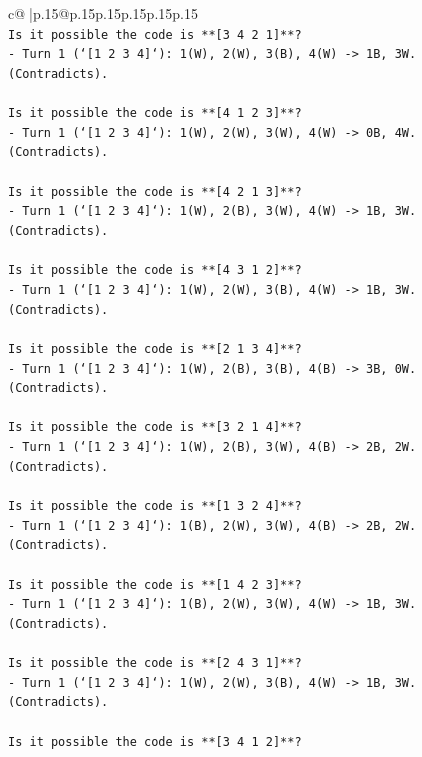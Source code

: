\documentclass{article}
\begin{document}
{\begin{supertabular}{c@{$\;$}|p{.15\linewidth}@{}p{.15\linewidth}p{.15\linewidth}p{.15\linewidth}p{.15\linewidth}p{.15\linewidth}}
{{{\\ 
\texttt{Is it possible the code is **{[}3 4 2 1{]}**?} \\
\texttt{{-} Turn 1 (`{[}1 2 3 4{]}`): 1(W), 2(W), 3(B), 4(W) {-}> 1B, 3W. (Contradicts).} \\
\\ 
\texttt{Is it possible the code is **{[}4 1 2 3{]}**?} \\
\texttt{{-} Turn 1 (`{[}1 2 3 4{]}`): 1(W), 2(W), 3(W), 4(W) {-}> 0B, 4W. (Contradicts).} \\
\\ 
\texttt{Is it possible the code is **{[}4 2 1 3{]}**?} \\
\texttt{{-} Turn 1 (`{[}1 2 3 4{]}`): 1(W), 2(B), 3(W), 4(W) {-}> 1B, 3W. (Contradicts).} \\
\\ 
\texttt{Is it possible the code is **{[}4 3 1 2{]}**?} \\
\texttt{{-} Turn 1 (`{[}1 2 3 4{]}`): 1(W), 2(W), 3(B), 4(W) {-}> 1B, 3W. (Contradicts).} \\
\\ 
\texttt{Is it possible the code is **{[}2 1 3 4{]}**?} \\
\texttt{{-} Turn 1 (`{[}1 2 3 4{]}`): 1(W), 2(B), 3(B), 4(B) {-}> 3B, 0W. (Contradicts).} \\
\\ 
\texttt{Is it possible the code is **{[}3 2 1 4{]}**?} \\
\texttt{{-} Turn 1 (`{[}1 2 3 4{]}`): 1(W), 2(B), 3(W), 4(B) {-}> 2B, 2W. (Contradicts).} \\
\\ 
\texttt{Is it possible the code is **{[}1 3 2 4{]}**?} \\
\texttt{{-} Turn 1 (`{[}1 2 3 4{]}`): 1(B), 2(W), 3(W), 4(B) {-}> 2B, 2W. (Contradicts).} \\
\\ 
\texttt{Is it possible the code is **{[}1 4 2 3{]}**?} \\
\texttt{{-} Turn 1 (`{[}1 2 3 4{]}`): 1(B), 2(W), 3(W), 4(W) {-}> 1B, 3W. (Contradicts).} \\
\\ 
\texttt{Is it possible the code is **{[}2 4 3 1{]}**?} \\
\texttt{{-} Turn 1 (`{[}1 2 3 4{]}`): 1(W), 2(W), 3(B), 4(W) {-}> 1B, 3W. (Contradicts).} \\
\\ 
\texttt{Is it possible the code is **{[}3 4 1 2{]}**?} \\
}}}
\end{supertabular}}
\end{document}
